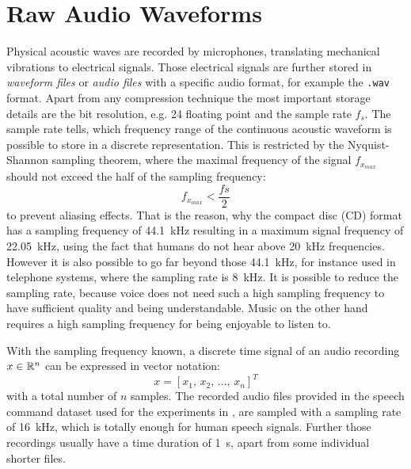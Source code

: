 
\section{Raw Audio Waveforms}\label{sec:signal_raw}
\thesisStateReady
Physical acoustic waves are recorded by microphones, translating mechanical vibrations to electrical signals. 
Those electrical signals are further stored in \emph{waveform files} or \emph{audio files} with a specific audio format, for example the \texttt{.wav} format.
Apart from any compression technique the most important storage details are the bit resolution, e.g. \SI{24}{\bit} floating point and the sample rate $f_s$. 
The sample rate tells, which frequency range of the continuous acoustic waveform is possible to store in a discrete representation.
This is restricted by the Nyquist-Shannon sampling theorem, where the maximal frequency of the signal $f_{x_{max}}$ should not exceed the half of the sampling frequency: 
\begin{equation}\label{eq:signal_raw_nyquist}
  f_{x_{max}} < \frac{fs}{2}
\end{equation}
to prevent aliasing effects.
That is the reason, why the compact disc (CD) format has a sampling frequency of \SI{44.1}{\kilo\hertz} resulting in a maximum signal frequency of \SI{22.05}{\kilo\hertz}, using the fact that humans do not hear above \SI{20}{\kilo\hertz} frequencies.
However it is also possible to go far beyond those \SI{44.1}{\kilo\hertz}, for instance used in telephone systems, where the sampling rate is \SI{8}{\kilo\hertz}.
It is possible to reduce the sampling rate, because voice does not need such a high sampling frequency to have sufficient quality and being understandable.
Music on the other hand requires a high sampling frequency for being enjoyable to listen to.

With the sampling frequency known, a discrete time signal of an audio recording $x \in \mathbb{R}^n$ can be expressed in vector notation:
\begin{equation}\label{eq:signal_raw_x}
  x = [x_1,\, x_2,\, \dots,\, x_n]^T
\end{equation}
with a total number of $n$ samples.
The recorded audio files provided in the speech command dataset \cite{Warden2018} used for the experiments in , are sampled with a sampling rate of \SI{16}{\kilo\hertz}, which is totally enough for human speech signals.
Further those recordings usually have a time duration of \SI{1}{\second}, apart from some individual shorter files.

